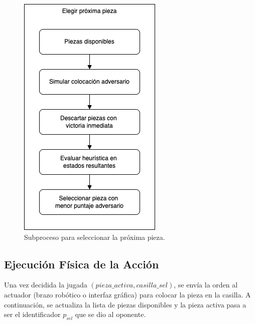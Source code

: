 \documentclass[conference]{IEEEtran}
\begin{document}
\begin{figure}[h!]
	\centering
	\includegraphics[width=0.95\linewidth]{img/asignar-pieza.png}
	\caption{Subproceso para seleccionar la próxima pieza.}
	\label{fig:asignar_pieza}
\end{figure}

\subsection{Ejecución Física de la Acción}

Una vez decidida la jugada $(pieza\_activa, casilla\_sel)$, se envía la orden al actuador (brazo robótico o interfaz gráfica) para colocar la pieza en la casilla. A continuación, se actualiza la lista de piezas disponibles y la pieza activa pasa a ser el identificador $p_{sel}$ que se dio al oponente.
\end{document}
